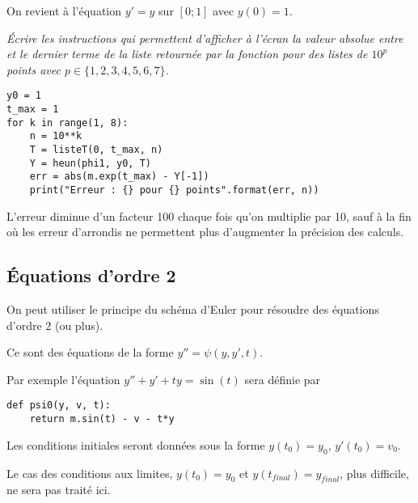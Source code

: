 \medskip

On revient à l'équation $y'=y$ sur $[0;1]$ avec $y(0)=1$.
\begin{Exercise}[title = {Qualité de l'approximation}]\it
Écrire les instructions qui permettent d'afficher à l'écran la valeur absolue entre  et le dernier terme de la liste retournée par la fonction  pour des listes de $10^p$ points avec $p\in \{1, 2, 3, 4, 5,6, 7\}$.
\end{Exercise}
\begin{Answer}
\begin{lstlisting}
y0 = 1
t_max = 1
for k in range(1, 8):
    n = 10**k
    T = listeT(0, t_max, n)
    Y = heun(phi1, y0, T)
    err = abs(m.exp(t_max) - Y[-1])
    print("Erreur : {} pour {} points".format(err, n))
\end{lstlisting}
L'erreur diminue d'un facteur 100 chaque fois qu'on multiplie par 10, sauf à la fin où les erreur d'arrondis ne permettent plus d'augmenter la précision des calculs. 
\end{Answer}
\subsection{Équations d'ordre 2}
On peut utiliser le principe du schéma d'Euler pour résoudre des équations d'ordre 2 (ou plus).

Ce sont des équations de la forme $y'' = \psi(y, y', t)$.

Par exemple l'équation $y'' + y' + ty = \sin(t)$ sera définie par

\begin{lstlisting}
def psi0(y, v, t):
    return m.sin(t) - v - t*y
\end{lstlisting}



Les conditions initiales seront données sous la forme $y(t_0) = y_0$, $y'(t_0) = v_0$.

Le cas des conditions aux limites, $y(t_0) = y_0$ et $y(t_{final}) = y_{final}$, plus difficile, ne sera pas traité ici.

